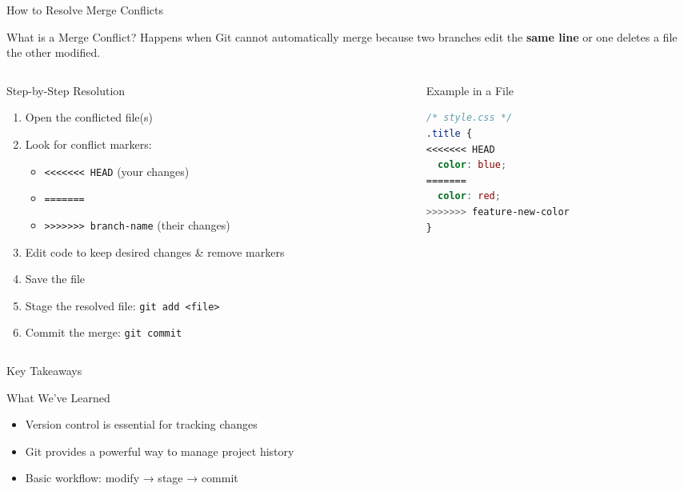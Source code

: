 \documentclass[aspectratio=169]{beamer}
\begin{document}
\begin{frame}[fragile]{How to Resolve Merge Conflicts}
  \begin{block}{What is a Merge Conflict?}
    Happens when Git cannot automatically merge because two branches edit the \textbf{same line} or one deletes a file the other modified.
  \end{block}
    
  \begin{columns}
    \begin{column}{0.5\textwidth}
      \begin{alertblock}{Step-by-Step Resolution}
        \begin{enumerate}
          \item Open the conflicted file(s)
          \item Look for conflict markers:
          \begin{itemize}
            \item \texttt{<<<<<<< HEAD} (your changes)
            \item \texttt{=======}
            \item \texttt{>>>>>>> branch-name} (their changes)
          \end{itemize}
          \item Edit code to keep desired changes \& remove markers
          \item Save the file
          \item Stage the resolved file: \texttt{git add <file>}
          \item Commit the merge: \texttt{git commit}
        \end{enumerate}
      \end{alertblock}
    \end{column}
    \begin{column}{0.45\textwidth}
      \begin{exampleblock}{Example in a File}
\begin{lstlisting}[language=css]
/* style.css */
.title {
<<<<<<< HEAD
  color: blue;
=======
  color: red;
>>>>>>> feature-new-color
}
\end{lstlisting}
      \end{exampleblock}
    \end{column}
  \end{columns}
\end{frame}

\begin{frame}{Key Takeaways}
  \begin{block}{What We've Learned}
    \begin{itemize}
      \item Version control is essential for tracking changes
      \item Git provides a powerful way to manage project history
      \item Basic workflow: modify → stage → commit
    \end{itemize}
  \end{block}

\end{frame}
\end{document}
